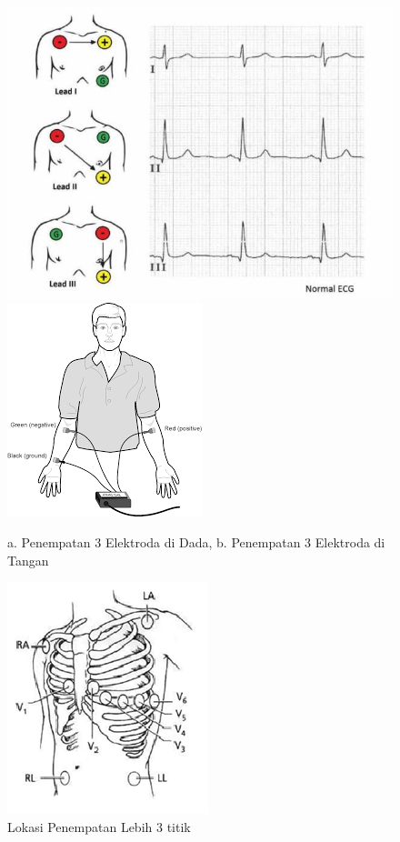 \begin{figure}[H]
    \centering
    \includegraphics[scale=0.3]{images/3_ecg_place.jpg}
	\includegraphics[scale=0.6]{images/3_ecg_place_2.png}    
    \caption{a. Penempatan 3 Elektroda di Dada, b. Penempatan 3 Elektroda di Tangan}
    \label{fig:electrode3}
	\includegraphics[scale=0.8]{images/multi_ecg.png}
    \caption{Lokasi Penempatan Lebih 3 titik}
    \label{fig:multi_elctrode}
\end{figure}

